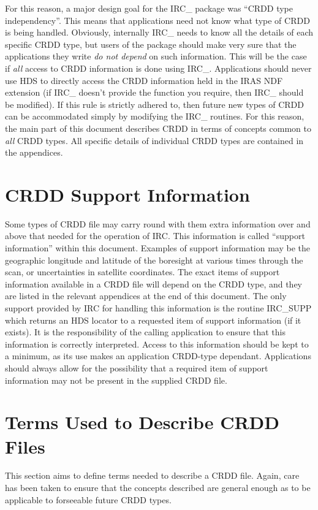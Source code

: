 For this reason, a major design goal for the IRC\_ package was ``CRDD type
independency''. This means that applications need not know what type of CRDD is
being handled. Obviously, internally IRC\_ needs to know all the details of each
specific CRDD type, but users of the package should make very sure that the
applications they write {\em do not depend } on such information. This will be
the case if {\em all} access to CRDD information is done using IRC\_. Applications
should never use HDS to directly access the CRDD information held in the IRAS
NDF extension (if IRC\_ doesn't provide the function you require, then IRC\_
should be modified). If this rule is strictly adhered to, then future new types
of CRDD can be accommodated simply by modifying the IRC\_ routines. For this
reason, the main part of this document describes CRDD in terms of concepts
common to {\em all} CRDD types. All specific details of individual CRDD types
are contained in the appendices. 

\section {CRDD Support Information}
\label {SEC:SUPP}
Some types of CRDD file may carry round with them extra information over and
above that needed for the operation of IRC. This information is called ``support
information'' within this document. Examples of support information may be the
geographic longitude and latitude of the boresight at various times through the
scan, or uncertainties in satellite coordinates. The exact items of support
information available in a CRDD file will depend on the CRDD type, and they are
listed in the relevant appendices at the end of this document. The only support
provided by IRC for handling this information is the routine IRC\_SUPP which
returns an HDS locator to a requested item of support information (if it
exists). It is the responsibility of the calling application to ensure that this
information is correctly interpreted. Access to this information should be kept
to a minimum, as its use makes an application CRDD-type dependant. Applications 
should always allow for the possibility that a required item of support 
information may not be present in the supplied CRDD file.

\section {Terms Used to Describe CRDD Files}
\label {SEC:TERMS}
This section aims to define terms needed to describe a CRDD file. Again, care
has been taken to ensure that the concepts described are general enough
as to be applicable to forseeable future CRDD types.

